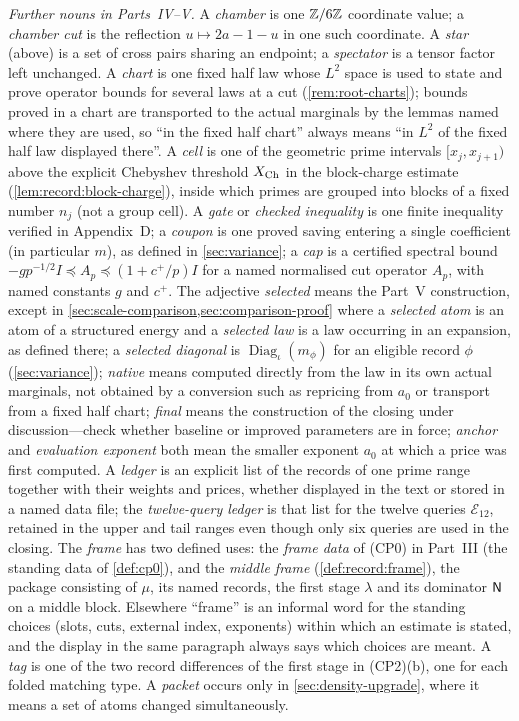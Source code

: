 \emph{Further nouns in Parts~IV--V.}
A \emph{chamber} is one $\mathbb Z/6\mathbb Z$ coordinate value; a \emph{chamber
cut} is the reflection $u\mapsto2a-1-u$ in one such coordinate. A
\emph{star} (above) is a set of cross pairs sharing an endpoint; a
\emph{spectator} is a tensor factor left unchanged. A \emph{chart}
is one fixed half law whose $L^2$ space is used to state and prove
operator bounds for several laws at a cut
(\cref{rem:root-charts}); bounds proved in a chart are transported
to the actual marginals by the lemmas named where they are used, so
``in the fixed half chart'' always means ``in $L^2$ of the fixed
half law displayed there''. A \emph{cell} is one of the geometric
prime intervals $[x_j,x_{j+1})$ above the explicit Chebyshev
threshold $X_{\rm Ch}$ in the block-charge estimate
(\cref{lem:record:block-charge}), inside which primes are grouped
into blocks of a fixed number $n_j$ (not a group cell). A \emph{gate} or
\emph{checked inequality} is one finite inequality verified in
Appendix~D; a \emph{coupon} is one proved saving entering a single
coefficient (in particular $m$), as defined in
\cref{sec:variance}; a \emph{cap} is a certified
spectral bound $-gp^{-1/2}I\preceq A_p\preceq(1+c^+/p)I$ for a
named normalised cut operator $A_p$, with named constants $g$ and
$c^+$. The adjective \emph{selected} means the Part~V
construction, except in \cref{sec:scale-comparison,sec:comparison-proof}
where a \emph{selected atom} is an atom of a structured energy
and a \emph{selected law} is a law occurring in an expansion, as
defined there; a \emph{selected diagonal} is
$\operatorname{Diag}_\iota(m_\phi)$ for an eligible record $\phi$
(\cref{sec:variance}); \emph{native} means computed directly from the
law in its own actual marginals, not obtained by a conversion such
as repricing from $a_0$ or transport from a fixed half chart; \emph{final} means the construction of the
closing under discussion---check whether baseline or improved
parameters are in force;
\emph{anchor} and \emph{evaluation exponent} both mean the smaller
exponent $a_0$ at which a price was first computed. A \emph{ledger}
is an explicit list of the records of one prime range together with
their weights and prices, whether displayed in the text or stored
in a named data file; the \emph{twelve-query ledger} is that list
for the twelve queries $\mathcal E_{12}$, retained in the upper and
tail ranges even though only six queries are used in the closing.
The \emph{frame} has two defined uses: the \emph{frame data} of
(CP0) in Part~III (the standing data of \cref{def:cp0}), and the
\emph{middle frame} (\cref{def:record:frame}), the package
consisting of $\mu$, its named records, the first stage $\lambda$
and its dominator $\mathsf N$ on a middle block. Elsewhere ``frame''
is an informal word for the
standing choices (slots, cuts, external index, exponents) within
which an estimate is stated, and the display in the same paragraph
always says which choices are meant. A \emph{tag} is one of the
two record differences of the first stage in (CP2)(b), one for
each folded matching type.
A \emph{packet} occurs only in \cref{sec:density-upgrade}, where it
means a set of atoms changed simultaneously.

